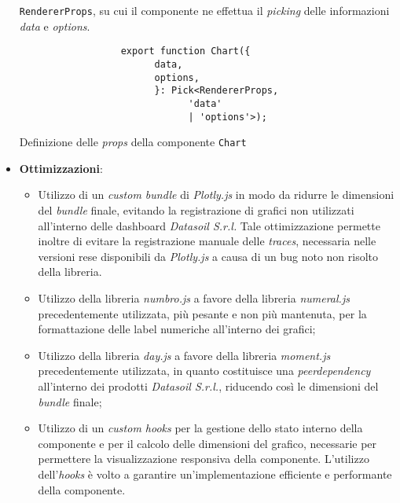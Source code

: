 \begin{itemize}
            \texttt{RendererProps}, su cui il componente ne effettua il \textit{picking}
            delle informazioni \textit{data} e \textit{options}.
            \begin{listing}[H]
                  \begin{verbatim}
                  export function Chart({
                        data,
                        options,
                        }: Pick<RendererProps, 
                              'data' 
                              | 'options'>);
                  \end{verbatim}
                  \caption{Definizione delle \textit{props} della componente \texttt{Chart}}
                  \label{listing:chartProps}
            \end{listing}
      \item \textbf{Ottimizzazioni}:
            \begin{itemize}
                  \item Utilizzo di un \textit{custom bundle} di \textit{Plotly.js} in modo da ridurre le dimensioni del \textit{bundle} finale, evitando la registrazione
                        di grafici non utilizzati all'interno delle dashboard \textit{Datasoil S.r.l.} Tale ottimizzazione permette inoltre di evitare la registrazione
                        manuale delle \textit{traces}, necessaria nelle versioni rese disponibili da \textit{Plotly.js} a causa di un bug noto non risolto della libreria.
                  \item Utilizzo della libreria \textit{numbro.js} a favore della libreria \textit{numeral.js} precedentemente utilizzata, più pesante e non più mantenuta,
                        per la formattazione delle label numeriche all'interno dei grafici;
                  \item Utilizzo della libreria \textit{day.js} a favore della libreria \textit{moment.js} precedentemente utilizzata, in quanto costituisce una
                        \textit{peerdependency} all'interno dei prodotti \textit{Datasoil S.r.l.}, riducendo così le dimensioni del \textit{bundle} finale;
                  \item Utilizzo di un \textit{custom hooks} per la gestione dello stato interno della componente e per il calcolo delle dimensioni del grafico, necessarie per permettere
                        la visualizzazione responsiva della componente. L'utilizzo dell'\textit{hooks} è volto a garantire un'implementazione efficiente e performante della componente.
            \end{itemize}
\end{itemize}

